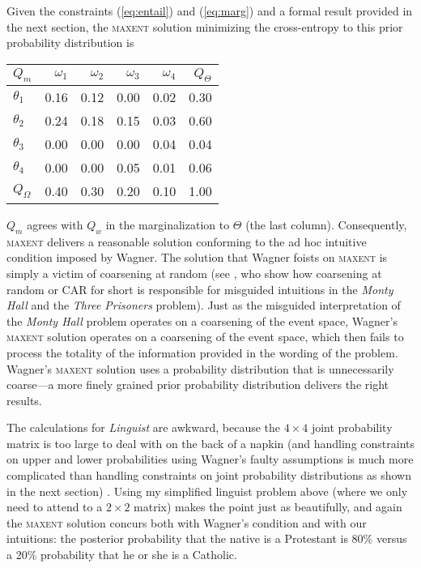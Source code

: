 \documentclass[11pt]{article}
\begin{document}
\medskip

Given the constraints (\ref{eq:entail}) and (\ref{eq:marg}) and a
formal result provided in the next section, the \textsc{maxent}
solution minimizing the cross-entropy to this prior probability
distribution is

\medskip

\begin{tabular}{|l|r|r|r|r|r|}\hline
  $Q_{m}$ & $\omega_{1}$ & $\omega_{2}$ & $\omega_{3}$ & $\omega_{4}$ & $Q_{\Theta}$ \\ \hline
$\theta_{1}$ & 0.16 & 0.12 & 0.00 & 0.02 & 0.30 \\ \hline
$\theta_{2}$ & 0.24 & 0.18 & 0.15 & 0.03 & 0.60 \\ \hline
$\theta_{3}$ & 0.00 & 0.00 & 0.00 & 0.04 & 0.04 \\ \hline
$\theta_{4}$ & 0.00 & 0.00 & 0.05 & 0.01 & 0.06 \\ \hline
$Q_{\Omega}$ & 0.40 & 0.30 & 0.20 & 0.10 & 1.00\\ \hline
\end{tabular}

\medskip

$Q_{m}$ agrees with $Q_{w}$ in the marginalization to $\Theta$ (the
last column). Consequently, \textsc{maxent} delivers a reasonable
solution conforming to the ad hoc intuitive condition imposed by
Wagner. The solution that Wagner foists on \textsc{maxent} is simply a
victim of coarsening at random (see ,
who show how coarsening at random or CAR for short is responsible for
misguided intuitions in the \emph{Monty Hall} and the \emph{Three
  Prisoners} problem). Just as the misguided interpretation of the
\emph{Monty Hall} problem operates on a coarsening of the event space,
Wagner's \textsc{maxent} solution operates on a coarsening of the
event space, which then fails to process the totality of the
information provided in the wording of the problem. Wagner's
\textsc{maxent} solution uses a probability distribution that is
unnecessarily coarse---a more finely grained prior probability
distribution delivers the right results.

The calculations for \emph{Linguist} are awkward, because the
$4\times{}4$ joint probability matrix is too large to deal with on the
back of a napkin (and handling constraints on upper and lower
probabilities using Wagner's faulty assumptions is much more
complicated than handling constraints on joint probability
distributions as shown in the next section) . Using my simplified
linguist problem above (where we only need to attend to a $2\times{}2$
matrix) makes the point just as beautifully, and again the
\textsc{maxent} solution concurs both with Wagner's condition and with
our intuitions: the posterior probability that the native is a
Protestant is 80\% versus a 20\% probability that he or she is a
Catholic.
\end{document}
